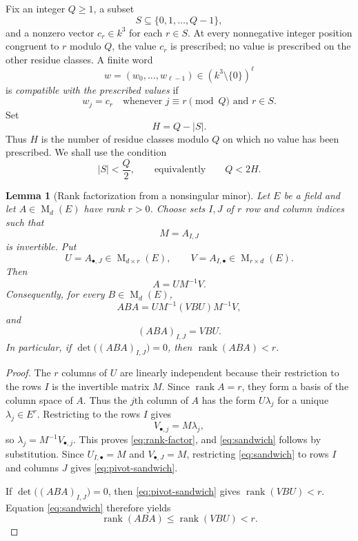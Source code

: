 \documentclass[11pt]{article}
\newtheorem{lemma}[theorem]{Lemma}
\newcommand{\rank}{\operatorname{rank}}
\newcommand{\Mat}{\operatorname{M}}
\begin{document}
Fix an integer $Q\ge1$, a subset
\[
S\subseteq\{0,1,\ldots,Q-1\},
\]
and a nonzero vector $c_r\in k^3$ for each $r\in S$.  At every nonnegative integer position congruent to $r$ modulo $Q$, the value $c_r$ is prescribed; no value is prescribed on the other residue classes.  A finite word
\[
w=(w_0,\ldots,w_{\ell-1})\in(k^3\setminus\{0\})^\ell
\]
is \emph{compatible with the prescribed values} if
\[
w_j=c_r
\quad\text{whenever }j\equiv r\pmod Q\text{ and }r\in S.
\]
Set
\[
H=Q-|S|.
\]
Thus $H$ is the number of residue classes modulo $Q$ on which no value has been prescribed.  We shall use the condition
\begin{equation}\label{eq:half-free}
|S|<\frac Q2,
\qquad\text{equivalently}\qquad Q<2H.
\end{equation}

\begin{lemma}[Rank factorization from a nonsingular minor]\label{lem:rank-factor}
Let $E$ be a field and let $A\in\Mat_d(E)$ have rank $r>0$.  Choose sets $I,J$ of $r$ row and column indices such that
\[
M=A_{I,J}
\]
is invertible.  Put
\[
U=A_{\bullet,J}\in\Mat_{d\times r}(E),
\qquad
V=A_{I,\bullet}\in\Mat_{r\times d}(E).
\]
Then
\begin{equation}\label{eq:rank-factor}
A=UM^{-1}V.
\end{equation}
Consequently, for every $B\in\Mat_d(E)$,
\begin{equation}\label{eq:sandwich}
ABA=UM^{-1}(VBU)M^{-1}V,
\end{equation}
and
\begin{equation}\label{eq:pivot-sandwich}
(ABA)_{I,J}=VBU.
\end{equation}
In particular, if $\det\bigl((ABA)_{I,J}\bigr)=0$, then $\rank(ABA)<r$.
\end{lemma}

\begin{proof}
The $r$ columns of $U$ are linearly independent because their restriction to the rows $I$ is the invertible matrix $M$.  Since $\rank A=r$, they form a basis of the column space of $A$.  Thus the $j$th column of $A$ has the form $U\lambda_j$ for a unique $\lambda_j\in E^r$.  Restricting to the rows $I$ gives
\[
V_{\bullet,j}=M\lambda_j,
\]
so $\lambda_j=M^{-1}V_{\bullet,j}$.  This proves \eqref{eq:rank-factor}, and \eqref{eq:sandwich} follows by substitution.  Since $U_{I,\bullet}=M$ and $V_{\bullet,J}=M$, restricting \eqref{eq:sandwich} to rows $I$ and columns $J$ gives \eqref{eq:pivot-sandwich}.

If $\det\bigl((ABA)_{I,J}\bigr)=0$, then \eqref{eq:pivot-sandwich} gives $\rank(VBU)<r$.  Equation \eqref{eq:sandwich} therefore yields
\[
\rank(ABA)\le\rank(VBU)<r.
\]
\end{proof}
\end{document}
